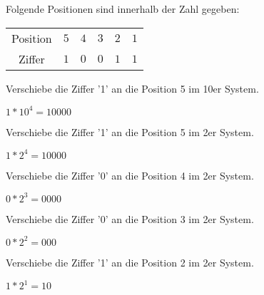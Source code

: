 \newpage
\begin{exerciseseries}[columns=1,solsubrule=\hrule]{}
    Folgende Positionen sind innerhalb der Zahl gegeben:
    \begin{center}
        \begin{tabular}{ c c c c c c }
            Position & $5$ & $4$ & $3$ & $2$ & $1$ \\
            Ziffer & $1$ & $0$ & $0$ & $1$ & $1$
        \end{tabular}
    \end{center}
    \begin{exercise}
        Verschiebe die Ziffer '1' an die Position 5 im 10er System.\\
        \underline{\hspace{12cm}}
    \end{exercise}
    \begin{solution}
        $1 * 10^4 = 10000$
    \end{solution}

    \begin{exercise}
        Verschiebe die Ziffer '1' an die Position 5 im 2er System.\\
        \underline{\hspace{12cm}}
    \end{exercise}
    \begin{solution}
        $1 * 2^4 = 10000$
    \end{solution}

    \begin{exercise}
        Verschiebe die Ziffer '0' an die Position 4 im 2er System.\\
        \underline{\hspace{12cm}}
    \end{exercise}
    \begin{solution}
        $0 * 2^3 = 0000$
    \end{solution}

    \begin{exercise}
        Verschiebe die Ziffer '0' an die Position 3 im 2er System.\\
        \underline{\hspace{12cm}}
    \end{exercise}
    \begin{solution}
        $0 * 2^2 = 000$
    \end{solution}

    \begin{exercise}
        Verschiebe die Ziffer '1' an die Position 2 im 2er System.\\
        \underline{\hspace{12cm}}
    \end{exercise}
    \begin{solution}
        $1 * 2^1 = 10$
    \end{solution}


\end{exerciseseries}
